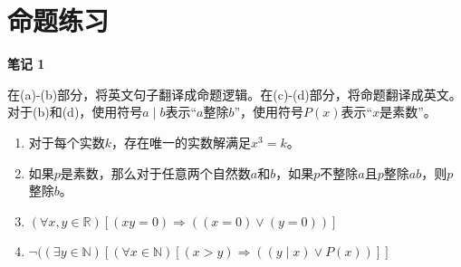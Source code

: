 \documentclass[11pt]{article}
\begin{document}
\section*{命题练习}
\textbf{笔记 1}

在(a)-(b)部分，将英文句子翻译成命题逻辑。在(c)-(d)部分，将命题翻译成英文。对于(b)和(d)，使用符号$a \mid b$表示“$a$整除$b$”，使用符号$P(x)$表示“$x$是素数”。

\begin{enumerate}
  \item 对于每个实数$k$，存在唯一的实数解满足$x^3 = k$。
  \item 如果$p$是素数，那么对于任意两个自然数$a$和$b$，如果$p$不整除$a$且$p$整除$ab$，则$p$整除$b$。
  \item $(\forall x,y \in \mathbb{R})[(xy = 0) \Rightarrow ((x = 0) \lor (y = 0))]$
  \item $\lnot((\exists y \in \mathbb{N})[(\forall x \in \mathbb{N})[(x > y) \Rightarrow ((y \mid x) \lor P(x))]]$
\end{enumerate}
\end{document}
